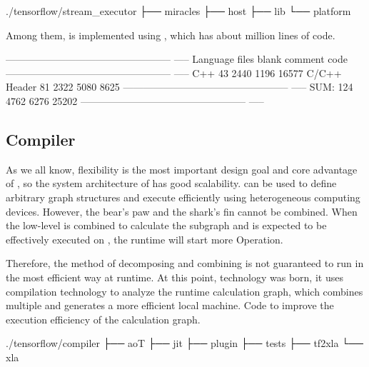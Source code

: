 \begin{content}
\begin{leftbar}
\begin{c++}[caption={StreamExecutorSource Structure}]
./tensorflow/stream_executor
├── miracles
├── host
├── lib
└── platform
\end{c++}
\end{leftbar}

Among them,  is implemented using , which has about  million lines of code.

\begin{leftbar}
\begin{python}[caption={StreamExecutorCode Statistics}]
-------------------------------------------------- -----
Language            files     blank   comment      code
-------------------------------------------------- -----
C++                    43      2440      1196     16577
C/C++ Header           81      2322      5080      8625
-------------------------------------------------- -----
SUM:                  124      4762      6276     25202
-------------------------------------------------- -----
\end{python}
\end{leftbar}

\subsection{Compiler}

As we all know, flexibility is the most important design goal and core advantage of \tf{}, so the system architecture of \tf{} has good scalability. \tf{} can be used to define arbitrary graph structures and execute efficiently using heterogeneous computing devices. However, the bear's paw and the shark's fin cannot be combined. When the low-level  is combined to calculate the subgraph and is expected to be effectively executed on , the runtime will start more  Operation.

Therefore, the \tf{}method of decomposing and combining  is not guaranteed to run in the most efficient way at runtime. At this point,  technology was born, it uses  compilation technology to analyze the runtime calculation graph, which combines multiple  and generates a more efficient local machine. Code to improve the execution efficiency of the calculation graph.

\begin{leftbar}
\begin{python}[caption={CompilerSource Structure}]
./tensorflow/compiler
├── aoT
├── jit
├── plugin
├── tests
├── tf2xla
└── xla
\end{python}
\end{leftbar}


\end{content}
